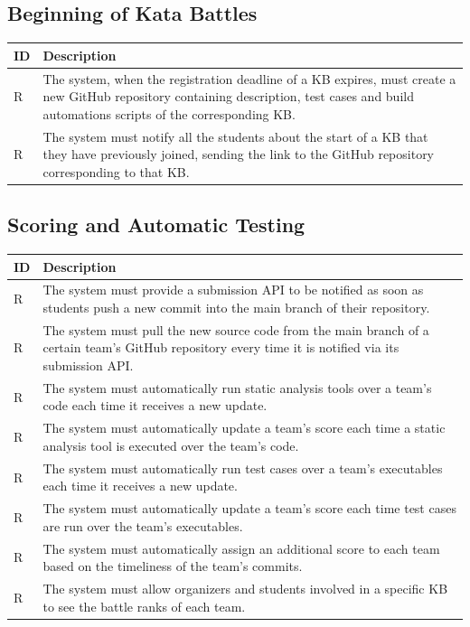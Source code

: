 \documentclass[11pt]{report}
\newcounter{rcounter}
\newcommand{\rc}{
    \addtocounter{rcounter}{1}
    R\arabic{rcounter}
}
\begin{document}
\subsection*{Beginning of Kata Battles}

\begin{longtable}[h] {|p{10mm}|p{130mm}|}
    \hline
    \rowcolor{gray!20}
    \textbf{ID} & \textbf{Description} \\ \hline
    \rc & The system, when the registration deadline of a KB expires, must create a new GitHub repository containing description, test cases and build automations scripts of the corresponding KB\@.
    \\ \hline
    \rc & The system must notify all the students about the start of a KB that they have previously joined, sending the link to the GitHub repository corresponding to that KB\@.
    \\ \hline
\end{longtable}

\subsection*{Scoring and Automatic Testing}

\begin{longtable}[h] {|p{10mm}|p{130mm}|}
    \hline
    \rowcolor{gray!20}
    \textbf{ID} & \textbf{Description} \\ \hline
    \rc & The system must provide a submission API to be notified as soon as students push a new commit into the main branch of their repository.
    \\ \hline
    \rc & The system must pull the new source code from the main branch of a certain team's GitHub repository every time it is notified via its submission API\@.
    \\ \hline
    \rc & The system must automatically run static analysis tools over a team’s code each time it receives a new update.
    \\ \hline
    \rc & The system must automatically update a team’s score each time a static analysis tool is executed over the team's code.
    \\ \hline
    \rc & The system must automatically run test cases over a team’s executables each time it receives a new update.
    \\ \hline
    \rc & The system must automatically update a team’s score each time test cases are run over the team's executables.
    \\ \hline
    \rc & The system must automatically assign an additional score to each team based on the timeliness of the team's commits.
    \\ \hline
    \rc & The system must allow organizers and students involved in a specific KB to see the battle ranks of each team.
    \\ \hline
\end{longtable}
\end{document}
